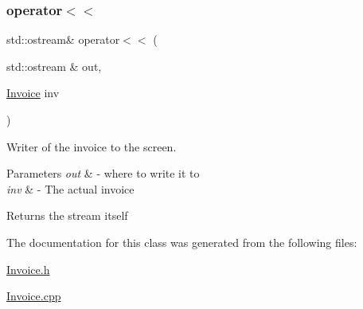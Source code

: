 \subsubsection{\texorpdfstring{operator$<$$<$}{operator<<}}
{\footnotesize\ttfamily std\+::ostream\& operator$<$$<$ (\begin{DoxyParamCaption}\item[{std\+::ostream \&}]{out,  }\item[{\mbox{\hyperlink{class_invoice}{Invoice}}}]{inv }\end{DoxyParamCaption})\hspace{0.3cm}{\ttfamily [friend]}}



Writer of the invoice to the screen. 


\begin{DoxyParams}{Parameters}
{\em out} & -\/ where to write it to \\
\hline
{\em inv} & -\/ The actual invoice \\
\hline
\end{DoxyParams}
\begin{DoxyReturn}{Returns}
the stream itself 
\end{DoxyReturn}


The documentation for this class was generated from the following files\+:\begin{DoxyCompactItemize}
\item 
\mbox{\hyperlink{_invoice_8h}{Invoice.\+h}}\item 
\mbox{\hyperlink{_invoice_8cpp}{Invoice.\+cpp}}\end{DoxyCompactItemize}
